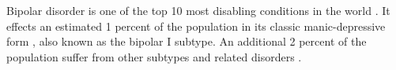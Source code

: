 Bipolar disorder is one of the top 10 most disabling conditions in the world \cite{kupfer_increasing_2005}. It effects an estimated 1 percent of the population in its classic manic-depressive form \cite{weissman_cross-national_1996}, also known as the bipolar I subtype. An additional 2 percent of the population suffer from other subtypes and related disorders \cite{kupfer_increasing_2005}. 
